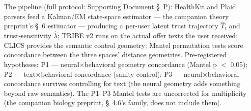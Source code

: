 \documentclass[11pt,twocolumn]{article}
\begin{document}
The pipeline (full protocol: Supporting Document \S~P): HealthKit and Plaid parsers feed a Kalman/EM state-space estimator --- the companion theory preprint's \S~6 estimator --- producing a per-user latent trust trajectory $\hat{T}_t$ and trust-sensitivity $\hat{\lambda}$; TRIBE v2 runs on the actual offer texts the user received; CLICS provides the semantic control geometry; Mantel permutation tests score concordance between the three spaces' distance geometries. Pre-registered hypotheses: P1 --- neural$\times$behavioral geometry concordance (Mantel p $<$ 0.05); P2 --- text$\times$behavioral concordance (sanity control); P3 --- neural$\times$behavioral concordance survives controlling for text (the neural geometry adds something beyond raw semantics). The P1--P3 Mantel tests are uncorrected for multiplicity (the companion biology preprint, \S~4.6's family, does not include them).
\end{document}
